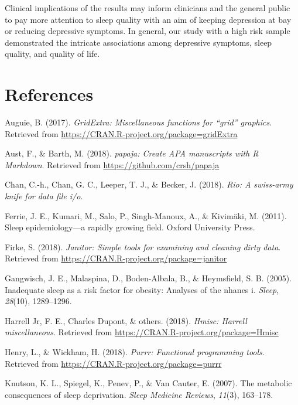 \documentclass[man, noextraspace]{apa6}
\theoremstyle{definition}
\theoremstyle{definition}
\theoremstyle{definition}
\theoremstyle{remark}
\begin{document}
Clinical implications of the results may inform clinicians and the
general public to pay more attention to sleep quality with an aim of
keeping depression at bay or reducing depressive symptoms. In general,
our study with a high risk sample demonstrated the intricate
associations among depressive symptoms, sleep quality, and quality of
life.

\newpage

\section{References}\label{references}

\begingroup
\setlength{\parindent}{-0.5in} \setlength{\leftskip}{0.5in}

\hypertarget{refs}{}
\hypertarget{ref-R-gridExtra}{}
Auguie, B. (2017). \emph{GridExtra: Miscellaneous functions for ``grid''
graphics}. Retrieved from
\url{https://CRAN.R-project.org/package=gridExtra}

\hypertarget{ref-R-papaja}{}
Aust, F., \& Barth, M. (2018). \emph{papaja: Create APA manuscripts with
R Markdown}. Retrieved from \url{https://github.com/crsh/papaja}

\hypertarget{ref-R-rio}{}
Chan, C.-h., Chan, G. C., Leeper, T. J., \& Becker, J. (2018).
\emph{Rio: A swiss-army knife for data file i/o}.

\hypertarget{ref-ferrie2011sleep}{}
Ferrie, J. E., Kumari, M., Salo, P., Singh-Manoux, A., \& Kivimäki, M.
(2011). Sleep epidemiology---a rapidly growing field. Oxford University
Press.

\hypertarget{ref-R-janitor}{}
Firke, S. (2018). \emph{Janitor: Simple tools for examining and cleaning
dirty data}. Retrieved from
\url{https://CRAN.R-project.org/package=janitor}

\hypertarget{ref-gangwisch2005inadequate}{}
Gangwisch, J. E., Malaspina, D., Boden-Albala, B., \& Heymsfield, S. B.
(2005). Inadequate sleep as a risk factor for obesity: Analyses of the
nhanes i. \emph{Sleep}, \emph{28}(10), 1289--1296.

\hypertarget{ref-R-Hmisc}{}
Harrell Jr, F. E., Charles Dupont, \& others. (2018). \emph{Hmisc:
Harrell miscellaneous}. Retrieved from
\url{https://CRAN.R-project.org/package=Hmisc}

\hypertarget{ref-R-purrr}{}
Henry, L., \& Wickham, H. (2018). \emph{Purrr: Functional programming
tools}. Retrieved from \url{https://CRAN.R-project.org/package=purrr}

\hypertarget{ref-knutson2007metabolic}{}
Knutson, K. L., Spiegel, K., Penev, P., \& Van Cauter, E. (2007). The
metabolic consequences of sleep deprivation. \emph{Sleep Medicine
Reviews}, \emph{11}(3), 163--178.
\end{document}
